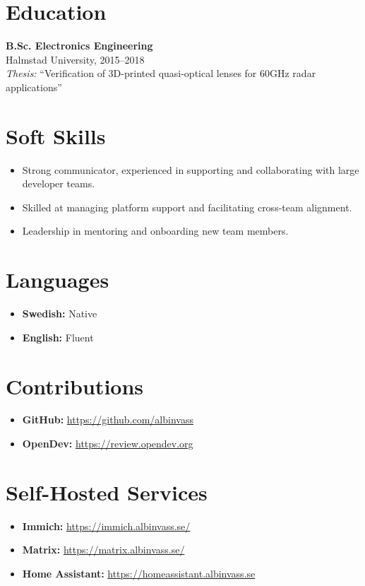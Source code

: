 \documentclass[11pt,a4paper]{article}
\begin{document}
\section{Education}
\textbf{B.Sc. Electronics Engineering} \\
Halmstad University, 2015--2018 \\
\textit{Thesis:} ``Verification of 3D-printed quasi-optical lenses for 60GHz radar applications''

\section{Soft Skills}
\begin{itemize}[leftmargin=*]
    \item Strong communicator, experienced in supporting and collaborating with large developer teams.
    \item Skilled at managing platform support and facilitating cross-team alignment.
    \item Leadership in mentoring and onboarding new team members.
\end{itemize}

\section{Languages}
\begin{itemize}[leftmargin=*]
    \item \textbf{Swedish:} Native
    \item \textbf{English:} Fluent
\end{itemize}

\section{Contributions}
\begin{itemize}[leftmargin=*]
    \item \textbf{GitHub:} \href{https://github.com/albinvass}{https://github.com/albinvass}
    \item \textbf{OpenDev:} \href{https://review.opendev.org/q/owner:albin\_vass}{https://review.opendev.org}
\end{itemize}

\section{Self-Hosted Services}
\begin{itemize}[leftmargin=*]
    \item \textbf{Immich:} \href{https://immich.albinvass.se/}{https://immich.albinvass.se/}
    \item \textbf{Matrix:} \href{https://matrix.albinvass.se/}{https://matrix.albinvass.se/}
    \item \textbf{Home Assistant:} \href{https://homeassistant.albinvass.se}{https://homeassistant.albinvass.se}
\end{itemize}
\end{document}
